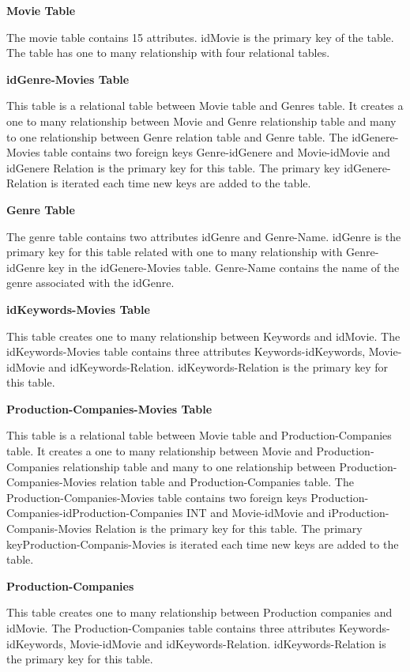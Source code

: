 \documentclass{article}
\begin{document}
\textbf{Movie Table}

The movie table contains 15 attributes. idMovie is the primary key of the table. The table has one to many relationship with four relational tables.\newline 

\textbf{idGenre-Movies Table}

This table is a relational table between Movie table and Genres table. It creates a one to many relationship between Movie and Genre relationship table and many to one relationship between Genre relation table and Genre table. The idGenere-Movies table contains two foreign keys Genre-idGenere and Movie-idMovie and idGenere Relation is the primary key for this table. The primary key idGenere-Relation is iterated each time new keys are added to the table.\newline

\textbf{Genre Table}

The genre table contains two attributes idGenre and Genre-Name. idGenre is the primary key for this table related with one to many relationship with Genre-idGenre key in the idGenere-Movies table. Genre-Name contains the name of the genre associated with the idGenre.\newline

\textbf{idKeywords-Movies Table}

This table creates one to many relationship between Keywords and idMovie. The idKeywords-Movies table contains three attributes Keywords-idKeywords, Movie-idMovie and idKeywords-Relation. idKeywords-Relation is the primary key for this table.\newline

\textbf{Production-Companies-Movies Table}

This table is a relational table between Movie table and Production-Companies table. It creates a one to many relationship between Movie and Production-Companies relationship table and many to one relationship between Production-Companies-Movies relation table and Production-Companies table. The Production-Companies-Movies table contains two foreign keys Production-Companies-idProduction-Companies INT and Movie-idMovie and iProduction-Companis-Movies Relation is the primary key for this table. The primary keyProduction-Companis-Movies is iterated each time new keys are added to the table.\newline

\textbf{Production-Companies}

This table creates one to many relationship between Production companies and idMovie. The Production-Companies table contains three attributes Keywords-idKeywords, Movie-idMovie and idKeywords-Relation. idKeywords-Relation is the primary key for this table.\newline
\end{document}
